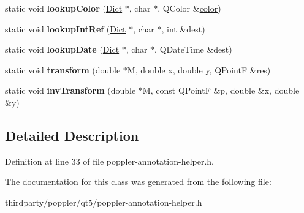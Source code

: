 \begin{DoxyCompactItemize}
static void {\bfseries lookup\+Color} (\hyperlink{class_dict}{Dict} $\ast$, char $\ast$, Q\+Color \&\hyperlink{structcolor}{color})
\item 
\mbox{\label{class_poppler_1_1_x_p_d_f_reader_ae7c3bb1d218438191e2b8d087d65e022}} 
static void {\bfseries lookup\+Int\+Ref} (\hyperlink{class_dict}{Dict} $\ast$, char $\ast$, int \&dest)
\item 
\mbox{\label{class_poppler_1_1_x_p_d_f_reader_a93e507c5cfb4c36539c78f11cb24fd73}} 
static void {\bfseries lookup\+Date} (\hyperlink{class_dict}{Dict} $\ast$, char $\ast$, Q\+Date\+Time \&dest)
\item 
\mbox{\label{class_poppler_1_1_x_p_d_f_reader_a3de1ffbfee858eb066cc808b8aac30dd}} 
static void {\bfseries transform} (double $\ast$M, double x, double y, Q\+PointF \&res)
\item 
\mbox{\label{class_poppler_1_1_x_p_d_f_reader_aaeab4b6ed029d07020de3ef07e44bcb8}} 
static void {\bfseries inv\+Transform} (double $\ast$M, const Q\+PointF \&p, double \&x, double \&y)
\end{DoxyCompactItemize}


\subsection{Detailed Description}


Definition at line 33 of file poppler-\/annotation-\/helper.\+h.



The documentation for this class was generated from the following file\+:\begin{DoxyCompactItemize}
\item 
thirdparty/poppler/qt5/poppler-\/annotation-\/helper.\+h\end{DoxyCompactItemize}
